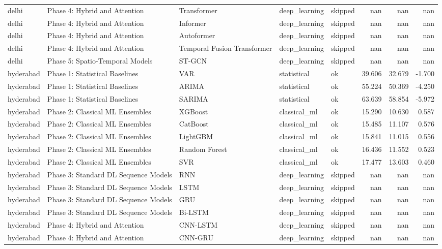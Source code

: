\documentclass[11pt,a4paper,oneside]{book}
\begin{document}
\begin{longtable}{@{}lllllrrr@{}}
delhi & Phase 4: Hybrid and Attention & Transformer & deep\_learning & skipped & nan & nan & nan \\
delhi & Phase 4: Hybrid and Attention & Informer & deep\_learning & skipped & nan & nan & nan \\
delhi & Phase 4: Hybrid and Attention & Autoformer & deep\_learning & skipped & nan & nan & nan \\
delhi & Phase 4: Hybrid and Attention & Temporal Fusion Transformer & deep\_learning & skipped & nan & nan & nan \\
delhi & Phase 5: Spatio-Temporal Models & ST-GCN & deep\_learning & skipped & nan & nan & nan \\
hyderabad & Phase 1: Statistical Baselines & VAR & statistical & ok & 39.606 & 32.679 & -1.700 \\
hyderabad & Phase 1: Statistical Baselines & ARIMA & statistical & ok & 55.224 & 50.369 & -4.250 \\
hyderabad & Phase 1: Statistical Baselines & SARIMA & statistical & ok & 63.639 & 58.854 & -5.972 \\
hyderabad & Phase 2: Classical ML Ensembles & XGBoost & classical\_ml & ok & 15.290 & 10.630 & 0.587 \\
hyderabad & Phase 2: Classical ML Ensembles & CatBoost & classical\_ml & ok & 15.485 & 11.107 & 0.576 \\
hyderabad & Phase 2: Classical ML Ensembles & LightGBM & classical\_ml & ok & 15.841 & 11.015 & 0.556 \\
hyderabad & Phase 2: Classical ML Ensembles & Random Forest & classical\_ml & ok & 16.436 & 11.552 & 0.523 \\
hyderabad & Phase 2: Classical ML Ensembles & SVR & classical\_ml & ok & 17.477 & 13.603 & 0.460 \\
hyderabad & Phase 3: Standard DL Sequence Models & RNN & deep\_learning & skipped & nan & nan & nan \\
hyderabad & Phase 3: Standard DL Sequence Models & LSTM & deep\_learning & skipped & nan & nan & nan \\
hyderabad & Phase 3: Standard DL Sequence Models & GRU & deep\_learning & skipped & nan & nan & nan \\
hyderabad & Phase 3: Standard DL Sequence Models & Bi-LSTM & deep\_learning & skipped & nan & nan & nan \\
hyderabad & Phase 4: Hybrid and Attention & CNN-LSTM & deep\_learning & skipped & nan & nan & nan \\
hyderabad & Phase 4: Hybrid and Attention & CNN-GRU & deep\_learning & skipped & nan & nan & nan \\

\end{longtable}
\end{document}
